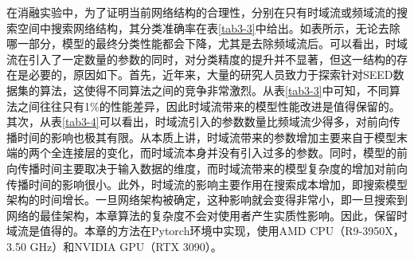 在消融实验中，为了证明当前网络结构的合理性，分别在只有时域流或频域流的搜索空间中搜索网络结构，其分类准确率在表\ref{tab3-3}中给出。如表所示，无论去除哪一部分，模型的最终分类性能都会下降，尤其是去除频域流后。可以看出，时域流在引入了一定数量的参数的同时，对分类精度的提升并不显著，但这一结构的存在是必要的，原因如下。首先，近年来，大量的研究人员致力于探索针对SEED数据集的算法，这使得不同算法之间的竞争非常激烈。从表\ref{tab3-3}中可知，不同算法之间往往只有1\%的性能差异，因此时域流带来的模型性能改进是值得保留的。其次，从表\ref{tab3-4}可以看出，时域流引入的参数数量比频域流少得多，对前向传播时间的影响也极其有限。从本质上讲，时域流带来的参数增加主要来自于模型末端的两个全连接层的变化，而时域流本身并没有引入过多的参数。同时，模型的前向传播时间主要取决于输入数据的维度，而时域流带来的模型复杂度的增加对前向传播时间的影响很小。此外，时域流的影响主要作用在搜索成本增加，即搜索模型架构的时间增长。一旦网络架构被确定，这种影响就会变得非常小，即一旦搜索到网络的最佳架构，本章算法的复杂度不会对使用者产生实质性影响。因此，保留时域流是值得的。本章的方法在Pytorch环境中实现，使用AMD CPU（R9-3950X，3.50 GHz）和NVIDIA GPU（RTX 3090）。
\begin{table*}[!h]
\caption{不同结构模型的时间复杂度}  \label{tab3-4}
\centering
{}
\end{table*}


